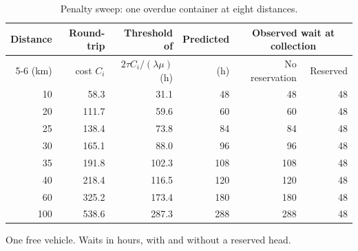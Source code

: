 \begin{table}[!htbp]
\caption{Penalty sweep: one overdue container at eight distances.}
\label{tab:pricesweep}
\centering
\small
\begin{tabular}{rrrrrr}
\toprule
Distance & Round-trip & Threshold of & Predicted & \multicolumn{2}{c}{Observed wait at collection} \\
\cmidrule(lr){5-6}
(km) & cost $C_i$ & $2\tau C_i/(\lambda\mu)$ (h) & (h) & No reservation & Reserved \\
\midrule
10 & 58.3 & 31.1 & 48 & 48 & 48 \\
20 & 111.7 & 59.6 & 60 & 60 & 48 \\
25 & 138.4 & 73.8 & 84 & 84 & 48 \\
30 & 165.1 & 88.0 & 96 & 96 & 48 \\
35 & 191.8 & 102.3 & 108 & 108 & 48 \\
40 & 218.4 & 116.5 & 120 & 120 & 48 \\
60 & 325.2 & 173.4 & 180 & 180 & 48 \\
100 & 538.6 & 287.3 & 288 & 288 & 48 \\
\bottomrule
\end{tabular}
\par\smallskip\footnotesize One free vehicle. Waits in hours, with and without a reserved head.
\end{table}
